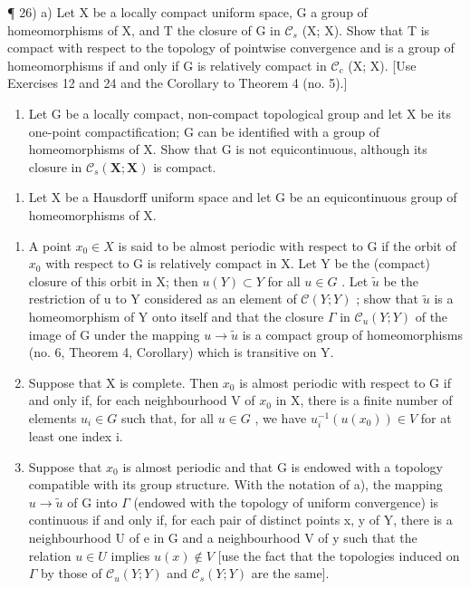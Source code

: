 ¶ 26) a) Let X be a locally compact uniform space, G a group of homeomorphisms of X, and T the closure of G in \(\mathcal{C}_{s}\) (X; X). Show that T is compact with respect to the topology of pointwise convergence and is a group of homeomorphisms if and only if G is relatively compact in \(\mathcal{C}_{c}\) (X; X). {[}Use Exercises 12 and 24 and the Corollary to Theorem 4 (no. 5).{]}

\begin{enumerate}
\def\labelenumi{\alph{enumi})}
\setcounter{enumi}{1}
\tightlist
\item
  Let G be a locally compact, non-compact topological group and let X be its one-point compactification; G can be identified with a group of homeomorphisms of X. Show that G is not equicontinuous, although its closure in \(\mathcal{C}_{s}(\mathbf{X};\mathbf{X})\) is compact.
\end{enumerate}

\begin{enumerate}
\def\labelenumi{\arabic{enumi})}
\setcounter{enumi}{26}
\tightlist
\item
  Let X be a Hausdorff uniform space and let G be an equicontinuous group of homeomorphisms of X.
\end{enumerate}

\begin{enumerate}
\def\labelenumi{\alph{enumi})}
\item
  A point \(x_{0} \in X\) is said to be almost periodic with respect to G if the orbit of \(x_{0}\) with respect to G is relatively compact in X. Let Y be the (compact) closure of this orbit in X; then \(u(Y) \subset Y\) for all \(u \in G\) . Let \(\tilde{u}\) be the restriction of u to Y considered as an element of \(\mathcal{C}(Y; Y)\) ; show that \(\tilde{u}\) is a homeomorphism of Y onto itself and that the closure \(\Gamma\) in \(\mathcal{C}_{u}(Y; Y)\) of the image of G under the mapping \(u \to \tilde{u}\) is a compact group of homeomorphisms (no. 6, Theorem 4, Corollary) which is transitive on Y.
\item
  Suppose that X is complete. Then \(x_{0}\) is almost periodic with respect to G if and only if, for each neighbourhood V of \(x_{0}\) in X, there is a finite number of elements \(u_{i} \in G\) such that, for all \(u \in G\) , we have \(u_{i}^{-1}(u(x_{0})) \in V\) for at least one index i.
\item
  Suppose that \(x_{0}\) is almost periodic and that G is endowed with a topology compatible with its group structure. With the notation of a), the mapping \(u \to \tilde{u}\) of G into \(\Gamma\) (endowed with the topology of uniform convergence) is continuous if and only if, for each pair of distinct points x, y of Y, there is a neighbourhood U of e in G and a neighbourhood V of y such that the relation \(u \in U\) implies \(u(x) \notin V\) {[}use the fact that the topologies induced on \(\Gamma\) by those of \(\mathcal{C}_{u}(Y; Y)\) and \(\mathcal{C}_{s}(Y; Y)\) are the same{]}.
\end{enumerate}

